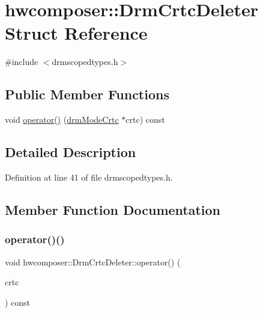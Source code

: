 \hypertarget{structhwcomposer_1_1DrmCrtcDeleter}{}\section{hwcomposer\+:\+:Drm\+Crtc\+Deleter Struct Reference}
\label{structhwcomposer_1_1DrmCrtcDeleter}


{\ttfamily \#include $<$drmscopedtypes.\+h$>$}

\subsection*{Public Member Functions}
\begin{DoxyCompactItemize}
\item 
void \mbox{\hyperlink{structhwcomposer_1_1DrmCrtcDeleter_a2a3db04810a8ad4a2fa5f7169ff3cc2e}{operator()}} (\mbox{\hyperlink{drmscopedtypes_8h_a847e3d935cfc3d51910e1a3934e88a1b}{drm\+Mode\+Crtc}} $\ast$crtc) const
\end{DoxyCompactItemize}


\subsection{Detailed Description}


Definition at line 41 of file drmscopedtypes.\+h.



\subsection{Member Function Documentation}
\mbox{\label{structhwcomposer_1_1DrmCrtcDeleter_a2a3db04810a8ad4a2fa5f7169ff3cc2e}} 
\subsubsection{\texorpdfstring{operator()()}{operator()()}}
{\footnotesize\ttfamily void hwcomposer\+::\+Drm\+Crtc\+Deleter\+::operator() (\begin{DoxyParamCaption}\item[{\mbox{\hyperlink{drmscopedtypes_8h_a847e3d935cfc3d51910e1a3934e88a1b}{drm\+Mode\+Crtc}} $\ast$}]{crtc }\end{DoxyParamCaption}) const}



